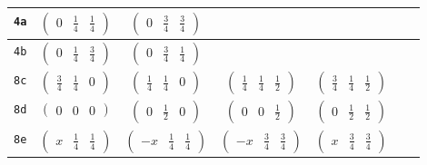 \documentclass[fleqn,9pt,landscape]{jsarticle}
\begin{document}
\begin{center}
\begin{longtable}{ccccccc}
{\tt 4a} & $ \begin{pmatrix} 0 & \frac{1}{4} & \frac{1}{4} \end{pmatrix} $ & $ \begin{pmatrix} 0 & \frac{3}{4} & \frac{3}{4} \end{pmatrix} $ & $  $ & $  $ & $  $ & $  $ \\ \hline
{\tt 4b} & $ \begin{pmatrix} 0 & \frac{1}{4} & \frac{3}{4} \end{pmatrix} $ & $ \begin{pmatrix} 0 & \frac{3}{4} & \frac{1}{4} \end{pmatrix} $ & $  $ & $  $ & $  $ & $  $ \\ \hline
{\tt 8c} & $ \begin{pmatrix} \frac{3}{4} & \frac{1}{4} & 0 \end{pmatrix} $ & $ \begin{pmatrix} \frac{1}{4} & \frac{1}{4} & 0 \end{pmatrix} $ & $ \begin{pmatrix} \frac{1}{4} & \frac{1}{4} & \frac{1}{2} \end{pmatrix} $ & $ \begin{pmatrix} \frac{3}{4} & \frac{1}{4} & \frac{1}{2} \end{pmatrix} $ & $  $ & $  $ \\ \hline
{\tt 8d} & $ \begin{pmatrix} 0 & 0 & 0 \end{pmatrix} $ & $ \begin{pmatrix} 0 & \frac{1}{2} & 0 \end{pmatrix} $ & $ \begin{pmatrix} 0 & 0 & \frac{1}{2} \end{pmatrix} $ & $ \begin{pmatrix} 0 & \frac{1}{2} & \frac{1}{2} \end{pmatrix} $ & $  $ & $  $ \\ \hline
{\tt 8e} & $ \begin{pmatrix} x & \frac{1}{4} & \frac{1}{4} \end{pmatrix} $ & $ \begin{pmatrix} - x & \frac{1}{4} & \frac{1}{4} \end{pmatrix} $ & $ \begin{pmatrix} - x & \frac{3}{4} & \frac{3}{4} \end{pmatrix} $ & $ \begin{pmatrix} x & \frac{3}{4} & \frac{3}{4} \end{pmatrix} $ & $  $ & $  $ \\ \hline

\end{longtable}
\end{center}
\end{document}
